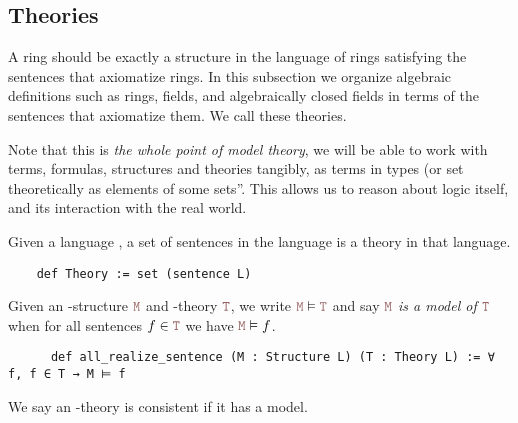 \subsection{Theories}

A ring should be exactly a structure in the language of rings satisfying the
sentences that axiomatize rings.
In this subsection we organize algebraic definitions such as rings, fields,
and algebraically closed fields in terms of the sentences that axiomatize them.
We call these theories.

Note that this is \textit{the whole point of model theory},
we will be able to work with terms, formulas, structures and theories tangibly,
as terms in types (or set theoretically as elements of some sets''.
This allows us to reason about logic itself,
and its interaction with the real world.

\begin{dfn}
  Given a language ,
  a set of sentences in the language is a theory in that language.
  \begin{lstlisting}
    def Theory := set (sentence L)   \end{lstlisting}

    Given an -structure $\code{M}$ and -theory $\code{T}$,
    we write $\code{M} \vDash \code{T}$ and say
    \emph{$\code{M}$ is a model of $\code{T}$} when
    for all sentences $f \in \code{T}$ we have $\code{M} \vDash f$.

    \begin{lstlisting}
      def all_realize_sentence (M : Structure L) (T : Theory L) := ∀ f, f ∈ T → M ⊨ f \end{lstlisting}

    We say an -theory is consistent if it has a model.
  \end{dfn}

